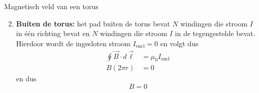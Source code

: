 \begin{app}{Magnetisch veld van een torus}
\begin{minipage}{.23\textwidth}
    \end{minipage}
    \begin{enumerate}
        \setcounter{enumi}{1}
        \item \textbf{Buiten de torus:} het pad buiten de torus bevat $N$ windingen die stroom $I$ in één richting bevat en $N$ windingen
        die stroom $I$ in de tegengestelde bevat. Hierdoor wordt de ingesloten stroom $I_{\text{encl}} = 0$ en volgt dus
        \begin{align*}
            \oint \Vec{B} \cdot d\Vec{\ell} &= \mu_{0}I_{\text{encl}} \\
                    B(2 \pi r) &= 0
        \end{align*}
        en dus
        \begin{equation*}
            B = 0
        \end{equation*}
    \end{enumerate}
\end{app}

